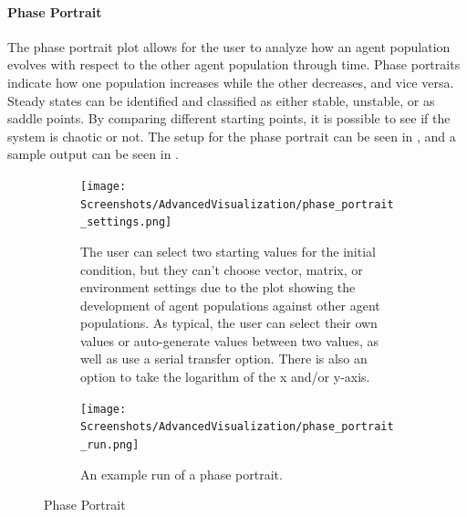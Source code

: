 \paragraph{Phase Portrait}
\label{sec:phase_portrait}
The phase portrait plot allows for the user to analyze how an agent population evolves with respect to the other agent population through time.
Phase portraits indicate how one population increases while the other decreases, and vice versa.
Steady states can be identified and classified as either stable, unstable, or as saddle points.
By comparing different starting points, it is possible to see if the system is chaotic or not.
The setup for the phase portrait can be seen in , and a sample output can be seen in . 

\begin{figure}[!ht]
    \centering
    \begin{subfigure}{0.49\linewidth}
        \centering
        \captionsetup{width=1\linewidth}
        \texttt{[image: Screenshots/AdvancedVisualization/phase\_portrait\_settings.png]}
        \caption{
            The user can select two starting values for the initial condition, but they can't choose vector, matrix, or environment settings due to the plot showing the development of agent populations against other agent populations.
            As typical, the user can select their own values or auto-generate values between two values, as well as use a serial transfer option.
            There is also an option to take the logarithm of the x and/or y-axis. 
        }
        \label{fig:ss:av:phase_portrait_settings}
    \end{subfigure}
    \hfill
    \begin{subfigure}{0.49\linewidth}
        \centering
        \captionsetup{width=1\linewidth}
        \texttt{[image: Screenshots/AdvancedVisualization/phase\_portrait\_run.png]}
        \caption{
            An example run of a phase portrait.
        }
        \label{fig:ss:av:phase_portrait_run}
    \end{subfigure}
    \caption{Phase Portrait}
\end{figure}

